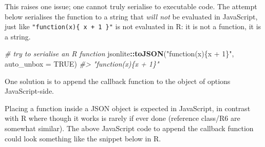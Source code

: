 \documentclass[10pt,]{krantz}
\makeatletter
\newenvironment{Shaded}{\begin{snugshade}}{\end{snugshade}}
\newcommand{\CommentTok}[1]{\textcolor[rgb]{0.37,0.37,0.37}{\textit{#1}}}
\newcommand{\ControlFlowTok}[1]{\textcolor[rgb]{0.27,0.27,0.27}{\textbf{#1}}}
\newcommand{\DataTypeTok}[1]{\textcolor[rgb]{0.27,0.27,0.27}{#1}}
\newcommand{\KeywordTok}[1]{\textcolor[rgb]{0.27,0.27,0.27}{\textbf{#1}}}
\newcommand{\NormalTok}[1]{#1}
\newcommand{\OperatorTok}[1]{\textcolor[rgb]{0.43,0.43,0.43}{\textbf{#1}}}
\newcommand{\OtherTok}[1]{\textcolor[rgb]{0.37,0.37,0.37}{#1}}
\newcommand{\StringTok}[1]{\textcolor[rgb]{0.5,0.5,0.5}{#1}}
\newenvironment{kframe}{%
\medskip{}
\setlength{\fboxsep}{.8em}
 \def\at@end@of@kframe{}%
 \ifinner\ifhmode%
  \def\at@end@of@kframe{\end{minipage}}%
  \begin{minipage}{\columnwidth}%
 \fi\fi%
 \def\FrameCommand##1{\hskip\@totalleftmargin \hskip-\fboxsep
 \colorbox{shadecolor}{##1}\hskip-\fboxsep
     \hskip-\linewidth \hskip-\@totalleftmargin \hskip\columnwidth}%
 \MakeFramed {\advance\hsize-\width
   \@totalleftmargin\z@ \linewidth\hsize
   \@setminipage}}%
 {\par\unskip\endMakeFramed%
 \at@end@of@kframe}
\renewenvironment{Shaded}{\begin{kframe}}{\end{kframe}}
\makeatother
\begin{document}
This raises one issue; one cannot truly serialise to executable code. The attempt below serialises the function to a string that \emph{will not} be evaluated in JavaScript, just like \texttt{"function(x)\{\ x\ +\ 1\ \}"} is not evaluated in R: it is not a function, it is a string.

\begin{Shaded}
\begin{Highlighting}[]
\CommentTok{# try to serialise an R function}
\NormalTok{jsonlite}\OperatorTok{::}\KeywordTok{toJSON}\NormalTok{(}\StringTok{"function(x)\{x + 1\}"}\NormalTok{, }\DataTypeTok{auto_unbox =} \OtherTok{TRUE}\NormalTok{)}
\CommentTok{#> "function(x)\{x + 1\}"}
\end{Highlighting}
\end{Shaded}

One solution is to append the callback function to the object of options JavaScript-side.

\begin{Shaded}
\end{Shaded}

Placing a function inside a JSON object is expected in JavaScript, in contrast with R where though it works is rarely if ever done (reference class/R6 are somewhat similar). The above JavaScript code to append the callback function could look something like the snippet below in R.

\begin{Shaded}
\end{Shaded}
\end{document}
